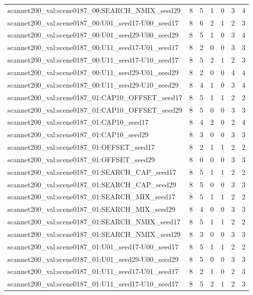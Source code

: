 \begin{table}[t]
\begin{tabular}{lrrrrrr}
scannet200\_val:scene0187\_00:SEARCH\_NMIX\_seed29 & 8 & 5 & 1 & 0 & 3 & 4 \\
scannet200\_val:scene0187\_00:U01\_seed17-U00\_seed17 & 8 & 6 & 2 & 1 & 2 & 3 \\
scannet200\_val:scene0187\_00:U01\_seed29-U00\_seed29 & 8 & 5 & 1 & 0 & 3 & 4 \\
scannet200\_val:scene0187\_00:U11\_seed17-U01\_seed17 & 8 & 2 & 0 & 0 & 3 & 3 \\
scannet200\_val:scene0187\_00:U11\_seed17-U10\_seed17 & 8 & 5 & 2 & 1 & 2 & 3 \\
scannet200\_val:scene0187\_00:U11\_seed29-U01\_seed29 & 8 & 2 & 0 & 0 & 4 & 4 \\
scannet200\_val:scene0187\_00:U11\_seed29-U10\_seed29 & 8 & 4 & 1 & 0 & 3 & 4 \\
scannet200\_val:scene0187\_01:CAP10\_OFFSET\_seed17 & 8 & 5 & 1 & 1 & 2 & 2 \\
scannet200\_val:scene0187\_01:CAP10\_OFFSET\_seed29 & 8 & 5 & 0 & 0 & 3 & 3 \\
scannet200\_val:scene0187\_01:CAP10\_seed17 & 8 & 4 & 2 & 0 & 2 & 4 \\
scannet200\_val:scene0187\_01:CAP10\_seed29 & 8 & 3 & 0 & 0 & 3 & 3 \\
scannet200\_val:scene0187\_01:OFFSET\_seed17 & 8 & 2 & 1 & 1 & 2 & 2 \\
scannet200\_val:scene0187\_01:OFFSET\_seed29 & 8 & 0 & 0 & 0 & 3 & 3 \\
scannet200\_val:scene0187\_01:SEARCH\_CAP\_seed17 & 8 & 5 & 1 & 1 & 2 & 2 \\
scannet200\_val:scene0187\_01:SEARCH\_CAP\_seed29 & 8 & 5 & 0 & 0 & 3 & 3 \\
scannet200\_val:scene0187\_01:SEARCH\_MIX\_seed17 & 8 & 5 & 1 & 1 & 2 & 2 \\
scannet200\_val:scene0187\_01:SEARCH\_MIX\_seed29 & 8 & 4 & 0 & 0 & 3 & 3 \\
scannet200\_val:scene0187\_01:SEARCH\_NMIX\_seed17 & 8 & 5 & 1 & 1 & 2 & 2 \\
scannet200\_val:scene0187\_01:SEARCH\_NMIX\_seed29 & 8 & 3 & 0 & 0 & 3 & 3 \\
scannet200\_val:scene0187\_01:U01\_seed17-U00\_seed17 & 8 & 5 & 1 & 1 & 2 & 2 \\
scannet200\_val:scene0187\_01:U01\_seed29-U00\_seed29 & 8 & 5 & 0 & 0 & 3 & 3 \\
scannet200\_val:scene0187\_01:U11\_seed17-U01\_seed17 & 8 & 2 & 1 & 0 & 2 & 3 \\
scannet200\_val:scene0187\_01:U11\_seed17-U10\_seed17 & 8 & 5 & 2 & 1 & 2 & 3 \\

\end{tabular}
\end{table}
